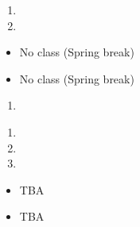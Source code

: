 \documentclass{article}
\begin{document}


\dia{}\NC{} 
\dia{}
\begin{enumerate}
\item {}
\item {}
\end{enumerate}


\week{}
\dia{}
\begin{itemize}
\item No class (Spring break)
\end{itemize}

\dia{}
\begin{itemize}
\item No class (Spring break)
\end{itemize}



\dia{}
\begin{enumerate}
\item {}
\end{enumerate}

\dia{}
\begin{enumerate}
\item {}
\item {}
\item {}
\end{enumerate}

\week{}

\dia{} 
\begin{itemize}
\item[ ] TBA
\end{itemize}

\dia{}
\begin{itemize}
\item[ ] TBA
\end{itemize}
\end{document}

